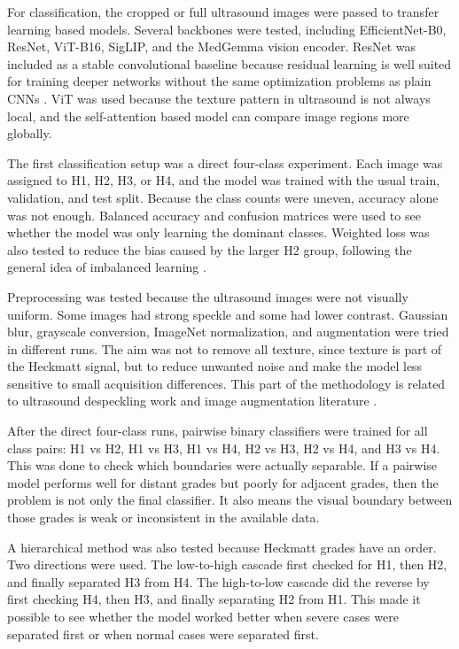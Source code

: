 ﻿\documentclass[12pt,a4paper]{report}
\begin{document}
For classification, the cropped or full ultrasound images were passed to transfer learning based models. Several backbones were tested, including EfficientNet-B0, ResNet, ViT-B16, SigLIP, and the MedGemma vision encoder. ResNet was included as a stable convolutional baseline because residual learning is well suited for training deeper networks without the same optimization problems as plain CNNs \cite{he2016resnet}. ViT was used because the texture pattern in ultrasound is not always local, and the self-attention based model can compare image regions more globally.

The first classification setup was a direct four-class experiment. Each image was assigned to H1, H2, H3, or H4, and the model was trained with the usual train, validation, and test split. Because the class counts were uneven, accuracy alone was not enough. Balanced accuracy and confusion matrices were used to see whether the model was only learning the dominant classes. Weighted loss was also tested to reduce the bias caused by the larger H2 group, following the general idea of imbalanced learning \cite{HeGarcia2009,Cui2019}.

Preprocessing was tested because the ultrasound images were not visually uniform. Some images had strong speckle and some had lower contrast. Gaussian blur, grayscale conversion, ImageNet normalization, and augmentation were tried in different runs. The aim was not to remove all texture, since texture is part of the Heckmatt signal, but to reduce unwanted noise and make the model less sensitive to small acquisition differences. This part of the methodology is related to ultrasound despeckling work \cite{YuActon2002,Loizou2005} and image augmentation literature \cite{Shorten2019,Cubuk2019}.

After the direct four-class runs, pairwise binary classifiers were trained for all class pairs: H1 vs H2, H1 vs H3, H1 vs H4, H2 vs H3, H2 vs H4, and H3 vs H4. This was done to check which boundaries were actually separable. If a pairwise model performs well for distant grades but poorly for adjacent grades, then the problem is not only the final classifier. It also means the visual boundary between those grades is weak or inconsistent in the available data.

A hierarchical method was also tested because Heckmatt grades have an order. Two directions were used. The low-to-high cascade first checked for H1, then H2, and finally separated H3 from H4. The high-to-low cascade did the reverse by first checking H4, then H3, and finally separating H2 from H1. This made it possible to see whether the model worked better when severe cases were separated first or when normal cases were separated first.
\end{document}
